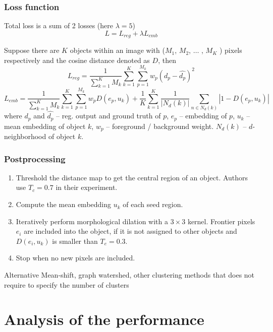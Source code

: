 \documentclass{beamer}
\begin{document}
\begin{frame}
    \frametitle{Loss function}

    Total loss is a sum of 2 losses (here $\lambda = 5$)
    \[
        L = L_{reg} + \lambda L_{emb}
    \]

    Suppose there are $K$ objects within an image with ($M_1$, $M_2$, $\dots$ , $M_K$ )
    pixels respectively and the cosine distance denoted as $D$, then
    \[
        L_{reg} = \frac{1}{\sum\limits_{k=1}^K M_k} \sum\limits_{k=1}^K \sum\limits_{p=1}^{M_k} w_p (d_p - \hat{d_p})^2
    \]
    \[
        L_{emb} = \frac{1}{\sum\limits_{k=1}^K M_k} \sum\limits_{k=1}^K \sum\limits_{p=1}^{M_k} w_p D(e_p, u_k) +
        \frac{1}{K} \sum\limits_{k=1}^K \frac{1}{|N_d(k)|} \sum\limits_{n \in N_d(k)} |1 - D(e_p, u_k)|
    \]
    where $d_p$ and $\hat{d_p}$ -- reg. output and ground truth of $p$, $e_p$ --
    embedding of $p$, $u_k$ -- mean embedding of object $k$,
    $w_p$ -- foreground / background weight. $N_d(k)$ -- $d$-neighborhood of object $k$.

\end{frame}

\begin{frame}
    \frametitle{Postprocessing}

    \begin{enumerate}
        \item Threshold the distance map to get the central region of an object. Authors use $T_c = 0.7$ in their experiment.
        \item Compute the mean embedding $u_k$ of each seed region.
        \item Iteratively perform morphological dilation with a $3 \times 3$ kernel.
              Frontier pixels $e_i$ are included into the object, if it is not assigned to other objects and
              $D(e_i, u_k)$ is smaller than $T_e = 0.3$.
        \item Stop when no new pixels are included.
    \end{enumerate}

    \begin{exampleblock}{Alternative}
        Mean-shift, graph watershed, other clustering methods that
        does not require to specify the number of clusters
    \end{exampleblock}

\end{frame}

\section{Analysis of the performance}
\end{document}
